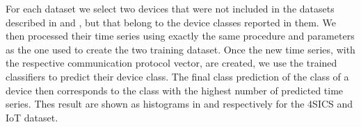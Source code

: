 For each dataset we select two devices that were not included in the datasets described in  and , but that belong to the device classes reported in them. We then processed their time series using exactly the same procedure and parameters as the one used to create the two training dataset. 
Once the new time series, with the respective communication protocol vector, are created, we use the trained classifiers to predict their device class. The final class prediction of the class of a device then corresponds to the class with the highest number of predicted time series. Thes result are shown as histograms in  and  respectively for the 4SICS and IoT dataset. 



\begin{figure}[h]
    \centering
    \begin{minipage}[c]{0.49\linewidth}
        \vspace{0pt}
        \centering
    \end{minipage}%
    \hfill%
    \begin{minipage}[c]{0.49\linewidth}
        \vspace{0pt}
        \centering

\end{minipage}
\end{figure}
